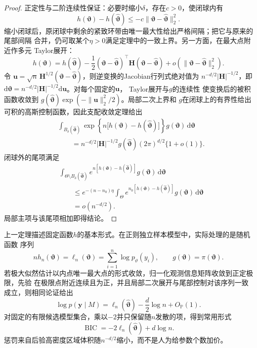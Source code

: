 \begin{proof}
正定性与二阶连续性保证：必要时缩小\(\delta\)，存在\(c>0\)，使闭球内有
\[
  h(\bm\vartheta)-h(\widehat{\bm\vartheta})
  \leq-c\lVert\bm\vartheta-\widehat{\bm\vartheta}\rVert_2^2.
\]
缩小闭球后，原闭球中剩余的紧致环带由唯一最大性给出严格间隔；把它与原来的尾部间隔
合并，仍可取某个\(\eta>0\)满足定理中的一致上界。另一方面，在最大点附近作多元
Taylor展开：
\[
  h(\bm\vartheta)
  =
  h(\widehat{\bm\vartheta})
  -\frac12(\bm\vartheta-\widehat{\bm\vartheta})^\top
  \bm H(\bm\vartheta-\widehat{\bm\vartheta})
  +o(\lVert\bm\vartheta-\widehat{\bm\vartheta}\rVert_2^2).
\]
令
\(\bm u=\sqrt n\,\bm H^{1/2}
(\bm\vartheta-\widehat{\bm\vartheta})\)，则逆变换的Jacobian行列式绝对值为
\(n^{-d/2}|\bm H|^{-1/2}\)，即
\(\mathrm d\bm\vartheta
=n^{-d/2}|\bm H|^{-1/2}\mathrm d\bm u\)。对每个固定的\(\bm u\)，
Taylor展开与\(g\)的连续性
使变换后的被积函数收敛到
\(g(\widehat{\bm\vartheta})\exp(-\lVert\bm u\rVert_2^2/2)\)。局部二次上界和
\(g\)在闭球上的有界性给出可积的高斯控制函数，因此支配收敛定理给出
\[
\begin{aligned}
  &\int_{B_\delta(\widehat{\bm\vartheta})}
  \exp\!\left\{n\bigl[h(\bm\vartheta)
    -h(\widehat{\bm\vartheta})\bigr]\right\}
  g(\bm\vartheta)\,\mathrm d\bm\vartheta\\
  &\qquad=n^{-d/2}|\bm H|^{-1/2}
  g(\widehat{\bm\vartheta})(2\pi)^{d/2}\{1+o(1)\}.
\end{aligned}
\]
闭球外的尾项满足
\[
\begin{aligned}
  &\int_{\Theta\setminus B_\delta(\widehat{\bm\vartheta})}
  e^{n[h(\bm\vartheta)-h(\widehat{\bm\vartheta})]}
  g(\bm\vartheta)\,\mathrm d\bm\vartheta\\
  &\qquad\leq e^{-(n-n_0)\eta}
  \int_\Theta
  e^{n_0[h(\bm\vartheta)-h(\widehat{\bm\vartheta})]}
  g(\bm\vartheta)\,\mathrm d\bm\vartheta\\
  &\qquad=o(n^{-d/2}).
\end{aligned}
\]
局部主项与该尾项相加即得结论。
\end{proof}

上一定理描述固定函数\(h\)的基本形式。在正则独立样本模型中，实际处理的是随机函数
序列
\[
  nh_n(\bm\vartheta)=\ell_n(\bm\vartheta)
  =\sum_{i=1}^n\log p_\vartheta(y_i),\qquad
  g(\bm\vartheta)=\pi(\bm\vartheta).
\]
若极大似然估计以内点唯一最大点的形式收敛，归一化观测信息矩阵收敛到正定极限，先验
在极限点附近连续且为正，并且局部二次展开与尾部控制对该序列一致成立，则相同论证给出
\[
  \log p(\bm y\mid M)
  =
  \ell_n(\widehat{\bm\vartheta})
  -\frac d2\log n+O_{\mathbb{P}}(1).
\]
对固定的有限候选模型集合，乘以\(-2\)并只保留随\(n\)发散的项，得到常用形式
\[
  \operatorname{BIC}
  =-2\ell_n(\widehat{\bm\vartheta})+d\log n.
\]
惩罚来自后验高密度区域体积随\(n^{-d/2}\)缩小，而不是人为给参数个数加价。


